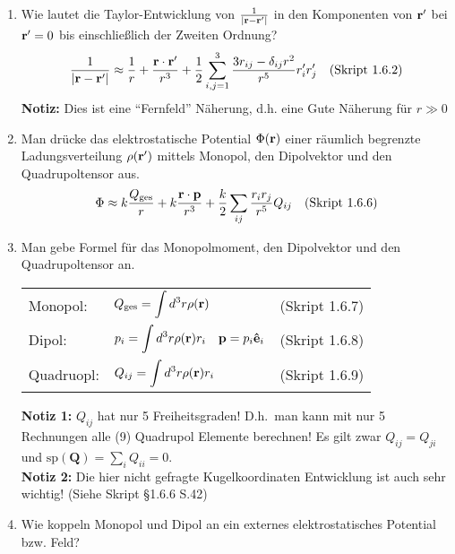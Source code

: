 \documentclass{scrartcl}
\newcommand{\rr}[1]{\frac{#1}{\abs{\vb{r}-\vb{r}'}}}
\newcommand{\ds}{\displaystyle}
\newcommand{\sref}[1]{(Skript #1)}
\newcommand{\smref}[1]{\quad\text{(Skript #1)}}
\begin{document}
  \begin{enumerate}
    \item Wie lautet die Taylor-Entwicklung von $\rr{1}$ in den Komponenten
          von $\vb r'$ bei $\vb r'=0$ bis einschließlich der Zweiten
          Ordnung?
          $$ 
          \rr{1}\approx \frac{1}{r}+\frac{\vb r\cdot\vb r'}{r^3} +
          \frac{1}{2}\sum_{i,j=1}^3\frac{3r_{ij}-\delta_{ij}r^2}{r^5}
          r_i'r_j'
          \quad\text{(Skript 1.6.2)}$$
          \textbf{Notiz:} Dies ist eine ``Fernfeld'' Näherung, d.h. 
          eine Gute Näherung für $r\gg 0$

    \item Man drücke das elektrostatische Potential $\Phi(\vb r)$ einer
          räumlich begrenzte Ladungsverteilung $\rho(\vb r')$ mittels
          Monopol, den Dipolvektor und den Quadrupoltensor aus.
          $$
          \Phi\approx k\frac{Q_\text{ges}}{r} +
          k\frac{\vb r\cdot \vb p}{r^3} +
          \frac{k}{2} \sum_{ij}\frac{r_ir_j}{r^5}Q_{ij}
          \smref{1.6.6}$$

    \item Man gebe Formel für das Monopolmoment, den Dipolvektor und den
          Quadrupoltensor an.
          \begin{center}
          \begin{tabular}{lll}
            Monopol:    & $\ds Q_{\text{ges}}=\int d^3r\rho(\vb r)$
                          &\sref{1.6.7}\\
            Dipol:      & $\ds p_i=\int d^3r\rho(\vb r)r_i
                          \quad\vb p=p_i\vu{e}_i $
                          &\sref{1.6.8}\\
            Quadruopl:  & $\ds Q_{ij}=\int d^3r\rho(\vb r)r_i$
                          &\sref{1.6.9}\\
          \end{tabular}
          \end{center}
          \textbf{Notiz 1:} $Q_{ij}$ hat nur 5 Freiheitsgraden! D.h.\ man kann           mit nur 5 Rechnungen alle (9) Quadrupol Elemente berechnen! Es
          gilt zwar $Q_{ij}=Q_{ji}$ und 
          $\text{sp}(\bm Q)=\sum_i Q_{ii}=0$.\\
          \textbf{Notiz 2:} Die hier nicht gefragte Kugelkoordinaten
          Entwicklung ist auch sehr wichtig! (Siehe Skript §1.6.6 S.42)

    \item Wie koppeln Monopol und Dipol an ein externes elektrostatisches
          Potential bzw. Feld?
          

\end{enumerate}
\end{document}
